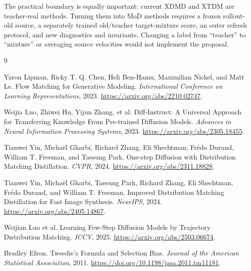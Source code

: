 \documentclass[11pt,a4paper]{article}
\theoremstyle{plain}
\theoremstyle{definition}
\begin{document}
The practical boundary is equally important: current XDMD and XTDM are teacher-real methods.
Turning them into MoD methods requires a frozen rollout-old source, a separately trained
old/teacher target-mixture score, an outer refresh protocol, and new diagnostics and invariants.
Changing a label from ``teacher'' to ``mixture'' or averaging source velocities would not
implement the proposal.

\begin{thebibliography}{9}

Yaron Lipman, Ricky T. Q. Chen, Heli Ben-Hamu, Maximilian Nickel, and Matt Le.
\newblock Flow Matching for Generative Modeling.
\newblock \emph{International Conference on Learning Representations}, 2023.
\newblock \url{https://arxiv.org/abs/2210.02747}.

Weijia Luo, Zhiwei Hu, Yijun Zhang, et al.
\newblock Diff-Instruct: A Universal Approach for Transferring Knowledge From Pre-trained
Diffusion Models.
\newblock \emph{Advances in Neural Information Processing Systems}, 2023.
\newblock \url{https://arxiv.org/abs/2305.18455}.

Tianwei Yin, Micha\"el Gharbi, Richard Zhang, Eli Shechtman, Fr\'edo Durand,
William T. Freeman, and Taesung Park.
\newblock One-step Diffusion with Distribution Matching Distillation.
\newblock \emph{CVPR}, 2024.
\newblock \url{https://arxiv.org/abs/2311.18828}.

Tianwei Yin, Micha\"el Gharbi, Taesung Park, Richard Zhang, Eli Shechtman,
Fr\'edo Durand, and William T. Freeman.
\newblock Improved Distribution Matching Distillation for Fast Image Synthesis.
\newblock \emph{NeurIPS}, 2024.
\newblock \url{https://arxiv.org/abs/2405.14867}.

Weijian Luo et al.
\newblock Learning Few-Step Diffusion Models by Trajectory Distribution Matching.
\newblock \emph{ICCV}, 2025.
\newblock \url{https://arxiv.org/abs/2503.06674}.

Bradley Efron.
\newblock Tweedie's Formula and Selection Bias.
\newblock \emph{Journal of the American Statistical Association}, 2011.
\newblock \url{https://doi.org/10.1198/jasa.2011.tm11181}.

\end{thebibliography}
\end{document}
